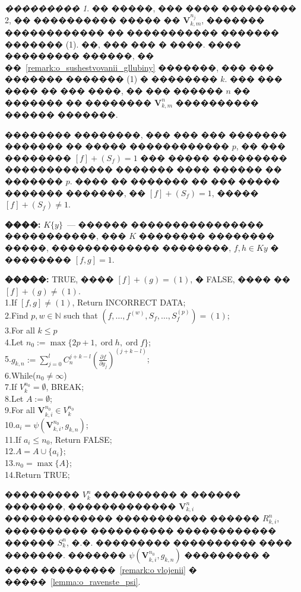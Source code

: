 \documentclass[16pt]{article}
\DeclareMathOperator{\ord}{ord}
\theoremstyle{plain}
\theoremstyle{definition}
\theoremstyle{remark}
\newtheorem{remark}[theorem]{���������}
\begin{document}
\begin{remark}
�� �����, ��� ���� ��������� 2, �� ���������� ����� �� $\mathbf{V}_{k,m}^{n_j}$, ������� ������������ �� ����������� ������� ������� (1). ��, ��� ��� � ����. ���� ��������� ������, �� ��~\ref{remark:o_sushestvovanii_gllubiny} �������, ��� ��� ������� ������� (1)  � �������� $k$. ��� ��� ���� �� ��� ����, �� ��� ������ $n$ �� ������� �� �������� $\mathbf{V}_{k,m}^{n}$ ���������� ������ �������.

�������� ��������, ��� ��� ��� ������� ������� �� ����� ������������ $p$, �� ��� �������� $[f]+(S_f)=1$ ��� ����� ��������� ������������� ������� ���� ������ �� ������� $p$. ���� �� ������� �� ��� ����� ������� �������, �� $[f]+(S_f)=1$, ����� $[f]+(S_f)\neq1$.
\end{remark}

{\bf ����:} $K\{y\}$~--- ������ ���������������� �����������, ��� $K$ �������� �������� �����, ������������� ��������, $f,h\in K{y}$ � �������� $[f,g]=1$.

{\bf �����:} TRUE, ����  $[f]+(g)=(1)$, � FALSE, ���� �� $[f]+(g)\not=(1)$.
\\
1.\qquad If $[f,g]\not=(1)$, Return  INCORRECT DATA;\\
2.\qquad Find $p,w\in \mathbb{N}$ such that $(f,\ldots,f^{(w)},S_f,\ldots,S_f^{(p)})=(1)$;\\
3.\qquad For all $k\leqslant p$\\
4.\qquad\qquad Let $n_0:=\max\{ 2p+1,\ord{h},\ord{f}\}$;\\
5.\qquad\qquad $g_{k,n}:=\sum\limits_{j=0}^{l}C_n^{j+k - l }\left(\frac{\partial f}{\partial y_j}\right)^{(j+k - l)}$;\\
6.\qquad\qquad While($n_0\not=\infty$)\\
7.\qquad\qquad\qquad If $V_k^{n_0}=\emptyset$, BREAK;\\
8.\qquad\qquad\qquad Let $A:=\emptyset$;\\
9.\qquad\qquad\qquad For all $\mathbf{V}_{k,i}^{n_0}\in V_k^{n_0}$\\
10.\qquad\qquad\qquad\qquad $a_i=\psi(\mathbf{V}_{k,i}^{n_0},g_{k,n})$;\\
11.\qquad\qquad\qquad\qquad If $a_i\leqslant n_0$, Return FALSE;\\
12.\qquad\qquad\qquad\qquad $A=A\cup\{a_i\}$;\\
13.\qquad\qquad\qquad $n_0=\max\{A\}$;\\
14.\qquad Return TRUE;

��������� $V_k^{n}$ ���������� � ������ �������, ������������� $\mathbf{V}_{k,i}^{n}$ ������������� ����������� ������ $R_{k,i}^{n}$, ���������� ���������� ������������ ������ $S_k^n$, �.�. ��������� ���������� ���� �������. 
������� $\psi(\mathbf{V}_{k,i}^{n_0},g_{k,n})$ ��������� � ���� ���������~\ref{remark:o vlojenii} � �����~\ref{lemma:o_ravenste_psi}.
\end{document}
